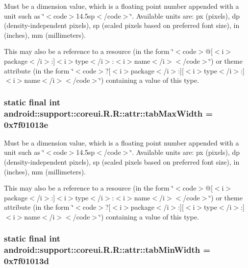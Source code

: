 Must be a dimension value, which is a floating point number appended with a unit such as \char`\"{}$<$code$>$14.5sp$<$/code$>$\char`\"{}. Available units are: px (pixels), dp (density-independent pixels), sp (scaled pixels based on preferred font size), in (inches), mm (millimeters). 

This may also be a reference to a resource (in the form \char`\"{}$<$code$>$@\mbox{[}$<$i$>$package$<$/i$>$:\mbox{]}$<$i$>$type$<$/i$>$:$<$i$>$name$<$/i$>$$<$/code$>$\char`\"{}) or theme attribute (in the form \char`\"{}$<$code$>$?\mbox{[}$<$i$>$package$<$/i$>$:\mbox{]}\mbox{[}$<$i$>$type$<$/i$>$:\mbox{]}$<$i$>$name$<$/i$>$$<$/code$>$\char`\"{}) containing a value of this type. \hypertarget{classandroid_1_1support_1_1coreui_1_1_r_1_1attr_1dcfdc5e1df53711db8ab52d0cd4a523}{
\subsubsection[{tabMaxWidth}]{\setlength{\rightskip}{0pt plus 5cm}static final int android::support::coreui.R.R::attr::tabMaxWidth = 0x7f01013e}}
\label{classandroid_1_1support_1_1coreui_1_1_r_1_1attr_1dcfdc5e1df53711db8ab52d0cd4a523}


Must be a dimension value, which is a floating point number appended with a unit such as \char`\"{}$<$code$>$14.5sp$<$/code$>$\char`\"{}. Available units are: px (pixels), dp (density-independent pixels), sp (scaled pixels based on preferred font size), in (inches), mm (millimeters). 

This may also be a reference to a resource (in the form \char`\"{}$<$code$>$@\mbox{[}$<$i$>$package$<$/i$>$:\mbox{]}$<$i$>$type$<$/i$>$:$<$i$>$name$<$/i$>$$<$/code$>$\char`\"{}) or theme attribute (in the form \char`\"{}$<$code$>$?\mbox{[}$<$i$>$package$<$/i$>$:\mbox{]}\mbox{[}$<$i$>$type$<$/i$>$:\mbox{]}$<$i$>$name$<$/i$>$$<$/code$>$\char`\"{}) containing a value of this type. \hypertarget{classandroid_1_1support_1_1coreui_1_1_r_1_1attr_0a1cc4b2adddd5afa5fe4992a1646216}{
\subsubsection[{tabMinWidth}]{\setlength{\rightskip}{0pt plus 5cm}static final int android::support::coreui.R.R::attr::tabMinWidth = 0x7f01013d}}
\label{classandroid_1_1support_1_1coreui_1_1_r_1_1attr_0a1cc4b2adddd5afa5fe4992a1646216}


